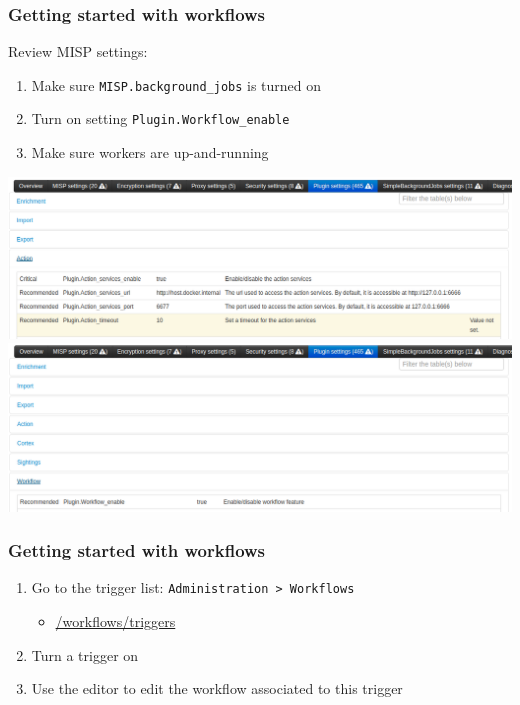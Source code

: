 \begin{frame}
    \frametitle{Getting started with workflows}
    Review MISP settings:
    \begin{enumerate}
        \item Make sure \texttt{MISP.background\_jobs} is turned on
        \item Turn on setting \texttt{Plugin.Workflow\_enable}
        \item Make sure workers are up-and-running
    \end{enumerate}
    \begin{center}
        \includegraphics[width=0.75\linewidth]{pictures/settings-1.png}
        \includegraphics[width=0.75\linewidth]{pictures/settings-2.png}
    \end{center}
\end{frame}

\begin{frame}
    \frametitle{Getting started with workflows}
    \begin{enumerate}
        \item Go to the trigger list: \texttt{Administration > Workflows}
        \begin{itemize}
            \item \url{/workflows/triggers}
        \end{itemize}
        \item Turn a trigger on
        \item Use the editor to edit the workflow associated to this trigger
    \end{enumerate}
\end{frame}

